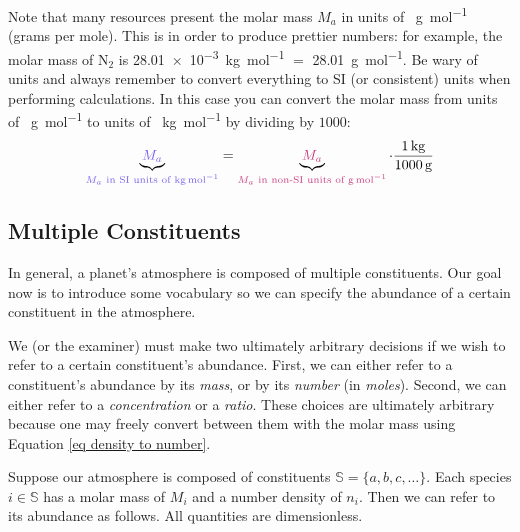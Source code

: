 Note that many resources present the molar mass \(M_a\) in units of \qty{}{\gram\per\mole} (grams per mole). This is in order to produce prettier numbers: for example, the molar mass of N\(_2\) is \qty{28.01e-3}{\kilogram\per\mole} \(=\) \qty{28.01}{\gram\per\mole}. Be wary of units and always remember to convert everything to SI (or consistent) units when performing calculations. In this case you can convert the molar mass from units of \qty{}{\gram\per\mole} to units of \qty{}{\kilogram\per\mole} by dividing by \(1000\):
\begin{align*}
    \underbrace{\textcolor{mydarkblue}{M_a}}_{\textcolor{mydarkblue}{M_a\text{ in SI units of \qty{}{\kilogram\per\mole}}}}
    =
    \underbrace{\textcolor{mymagenta}{M_a}}_{\textcolor{mymagenta}{M_a\text{ in non-SI units of \qty{}{\gram\per\mole}}}}
    \cdot\frac{\qty{1}{\kilogram}}{\qty{1000}{\gram}}
\end{align*}

\subsection{Multiple Constituents}\label{ss Multiple}

In general, a planet's atmosphere is composed of multiple constituents. Our goal now is to introduce some vocabulary so we can specify the abundance of a certain constituent in the atmosphere.

We (or the examiner) must make two ultimately arbitrary decisions if we wish to refer to a certain constituent's abundance. First, we can either refer to a constituent's abundance by its \textit{mass}, or by its \textit{number} (in \textit{moles}). Second, we can either refer to a \textit{concentration} or a \textit{ratio}. These choices are ultimately arbitrary because one may freely convert between them with the molar mass using Equation \ref{eq density to number}.

Suppose our atmosphere is composed of constituents  \(\mathbb{S}=\{a,b,c,\ldots\}\). Each species \(i\in\mathbb{S}\) has a molar mass of \(M_i\) and a number density of \(n_i\). Then we can refer to its abundance as follows. All quantities are dimensionless.

